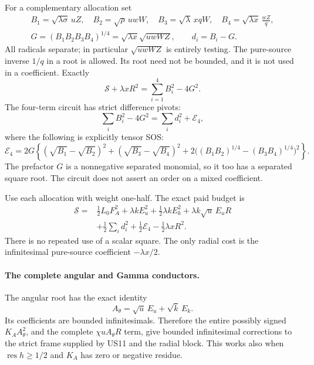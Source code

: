 For a complementary allocation set
\[
 \begin{gathered}
 B_1=\sqrt{\lambda\sigma}\,uZ,\quad
 B_2=\sqrt\rho\,uwW,\quad
 B_3=\sqrt\lambda\,xqW,\quad
 B_4=\sqrt{\lambda x}\,\frac{wZ}{q},\\
 G=(B_1B_2B_3B_4)^{1/4}
       =\sqrt{\lambda x}\sqrt{uwWZ},\qquad d_i=B_i-G.
 \end{gathered}
 \tag{US7}
\]
All radicals separate; in particular $\sqrt{uwWZ}$ is entirely
testing. The pure-source inverse $1/q$ in a root is allowed. Its
root need not be bounded, and it is not used in a coefficient.
Exactly
\[
 \boxed{\mathscr S+\lambda xR^2
               =\sum_{i=1}^4 B_i^2-4G^2.}
 \tag{US8}
\]
The four-term circuit has strict difference pivots:
\[
 \sum_iB_i^2-4G^2=\sum_i d_i^2+\mathcal E_4,
 \tag{US9}
\]
where the following is explicitly tensor SOS:
\[
 \mathcal E_4=2G\left\{
 (\sqrt{B_1}-\sqrt{B_2})^2+
 (\sqrt{B_3}-\sqrt{B_4})^2+
 2\bigl((B_1B_2)^{1/4}-(B_3B_4)^{1/4}\bigr)^2
 \right\}.
 \tag{US10}
\]
The prefactor $G$ is a nonnegative separated monomial, so it too
has a separated square root. The circuit does not assert an order
on a mixed coefficient.

Use each allocation with weight one-half. The exact paid budget is
\[
\begin{split}
 \mathscr S={}&\tfrac12L_0F_A^2+
       \lambda kE_u^2+\tfrac12\lambda kE_k^2
       +\lambda k\sqrt u\,E_uR\\
     &+\tfrac12\sum_i d_i^2+\tfrac12\mathcal E_4
                             -\tfrac12\lambda xR^2.
\end{split}\tag{US11}
\]
There is no repeated use of a scalar square. The only radial cost
is the infinitesimal pure-source coefficient $-\lambda x/2$.

\paragraph{The complete angular and Gamma conductors.}
The angular root has the exact identity
\[
             A_\theta=\sqrt u\,E_u+\sqrt k\,E_k.
             \tag{US12}
\]
Its coefficients are bounded infinitesimals. Therefore the entire
possibly signed $K_AA_\theta^2$, and the complete
$\chi uA_\theta R$ term, give bounded infinitesimal corrections
to the strict frame supplied by US11 and the radial block.
This works also when $\operatorname{res}h\ge1/2$ and $K_A$ has
zero or negative residue.

